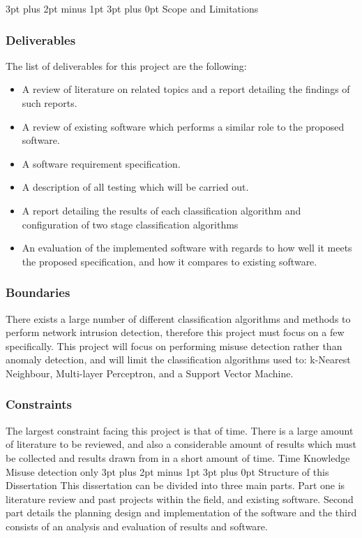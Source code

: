 \documentclass[12pt,a4paper]{article}
\makeatletter
\renewcommand\subsection{\@startsection {subsection}{1}{2mm} %
      {3pt plus 2pt minus 1pt} %
      {3pt plus 0pt} %
      {\normalfont\bfseries}}
\makeatother
\begin{document}
\subsection{Scope and Limitations}
	\subsubsection{Deliverables}
	The list of deliverables for this project are the following:
	\begin{itemize}
	\item{A review of literature on related topics and a report detailing the findings of such reports.}
	\item{A review of existing software which performs a similar role to the proposed software.}
	\item{A software requirement specification.}
	\item{A description of all testing which will be carried out.}
	\item{A report detailing the results of each classification algorithm and configuration of two stage classification algorithms}
	\item{An evaluation of the implemented software with regards to how well it meets the proposed specification, and how it compares to existing software.}
	\end{itemize}
	\subsubsection{Boundaries}
	There exists a large number of different classification algorithms and methods to perform network intrusion detection, therefore this project must focus on a few specifically. This project will focus on performing misuse detection rather than anomaly detection, and will limit the classification algorithms used to: k-Nearest Neighbour, Multi-layer Perceptron, and a Support Vector Machine.
	\subsubsection{Constraints}
	The largest constraint facing this project is that of time. There is a large amount of literature to be reviewed, and also a considerable amount of results which must be collected and results drawn from in a short amount of time.
	Time
	Knowledge
	Misuse detection only
\subsection{Structure of this Dissertation}
This dissertation can be divided into three main parts. Part one is literature review and past projects within the field, and existing software. Second part details the planning design and implementation of the software and the third consists of an analysis and evaluation of results and software.
\end{document}
